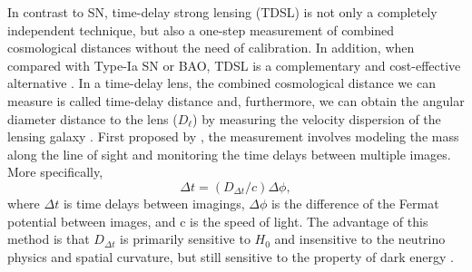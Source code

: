 \documentclass[useAMS,usenatbib]{mnras}
\newcommand{\Ddt}{D_{\Delta t}}
\begin{document}

In contrast to SN, time-delay strong lensing (TDSL) is not only a completely independent technique, but also a one-step measurement of combined cosmological distances without the need of calibration. In addition, when compared with Type-Ia SN or BAO, TDSL is a complementary and cost-effective alternative \citep{SuyuEtal13,TewesEtal13a}.
In a time-delay lens, the combined cosmological distance we can measure is called time-delay distance \citep[$\Ddt$; see the review by][]{TreuMarshall16, SuyuEtal18} and, furthermore, we can obtain the angular diameter distance to the lens ($D_{\ell}$) by measuring the velocity dispersion of the lensing galaxy \citep{JeeEtal15,JeeEtal16,BirrerEtal18}. 
First proposed by \citet{Refsdal64}, the measurement involves modeling the mass along the line of sight and monitoring the time delays between multiple images. 
More specifically, 
\begin{equation}
\label{eq:TDeq}
\Delta t=(\Ddt/c)\Delta\phi,
\end{equation}
where $\Delta t$ is time delays between imagings, $\Delta\phi$ is the difference of the Fermat potential between images, and c is the speed of light. 
The advantage of this method is that $\Ddt$ is primarily sensitive to $H_{0}$ and insensitive to the neutrino physics and spatial curvature, but still sensitive to the property of dark energy \citep{BonvinEtal17,BirrerEtal18}.

\end{document}
